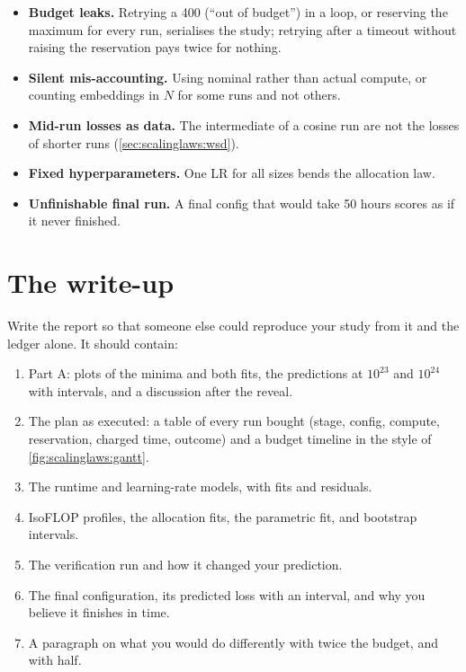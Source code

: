 \begin{pitfall}
\begin{itemize}
\item \textbf{Budget leaks.} Retrying a 400 (``out of budget'') in a loop, or reserving the
      maximum for every run, serialises the study; retrying after a timeout without raising the
      reservation pays twice for nothing.
\item \textbf{Silent mis-accounting.} Using nominal rather than actual compute, or counting
      embeddings in $N$ for some runs and not others.
\item \textbf{Mid-run losses as data.} The intermediate  of a cosine run are
      not the losses of shorter runs (\cref{sec:scalinglaws:wsd}).
\item \textbf{Fixed hyperparameters.} One LR for all sizes bends the allocation law.
\item \textbf{Unfinishable final run.} A final config that would take 50 hours scores as if
      it never finished.
\end{itemize}
\end{pitfall}

\section{The write-up}\label{sec:proj3:writeup}

Write the report so that someone else could reproduce your study from it and the ledger alone. It
should contain:
\begin{enumerate}
\item Part A: plots of the minima and both fits, the predictions at $10^{23}$ and $10^{24}$ with
      intervals, and a discussion after the reveal.
\item The plan as executed: a table of every run bought (stage, config, compute, reservation,
      charged time, outcome) and a budget timeline in the style of \cref{fig:scalinglaws:gantt}.
\item The runtime and learning-rate models, with fits and residuals.
\item IsoFLOP profiles, the allocation fits, the parametric fit, and bootstrap intervals.
\item The verification run and how it changed your prediction.
\item The final configuration, its predicted loss with an interval, and why you believe it
      finishes in time.
\item A paragraph on what you would do differently with twice the budget, and with half.
\end{enumerate}

